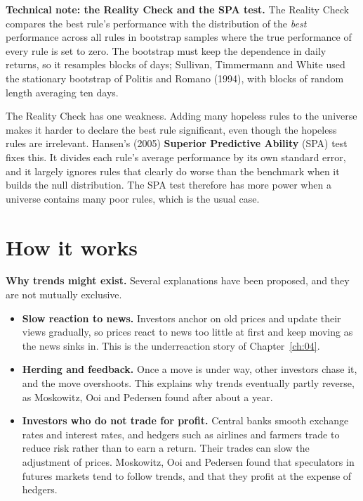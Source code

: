 \begin{technote}
\textbf{Technical note: the Reality Check and the SPA test.} The Reality Check compares the best rule's performance with the distribution of the \emph{best} performance across all rules in bootstrap samples where the true performance of every rule is set to zero. The bootstrap must keep the dependence in daily returns, so it resamples blocks of days; Sullivan, Timmermann and White used the stationary bootstrap of Politis and Romano (1994), with blocks of random length averaging ten days.

The Reality Check has one weakness. Adding many hopeless rules to the universe makes it harder to declare the best rule significant, even though the hopeless rules are irrelevant. Hansen's (2005) \textbf{Superior Predictive Ability} (SPA) test fixes this. It divides each rule's average performance by its own standard error, and it largely ignores rules that clearly do worse than the benchmark when it builds the null distribution. The SPA test therefore has more power when a universe contains many poor rules, which is the usual case.
\end{technote}


\section{How it works}
\label{sec:08-how}

\textbf{Why trends might exist.} Several explanations have been proposed, and they are not mutually exclusive.

\begin{itemize}
  \item \textbf{Slow reaction to news.} Investors anchor on old prices and update their views gradually, so prices react to news too little at first and keep moving as the news sinks in. This is the underreaction story of Chapter~\ref{ch:04}.
  \item \textbf{Herding and feedback.} Once a move is under way, other investors chase it, and the move overshoots. This explains why trends eventually partly reverse, as Moskowitz, Ooi and Pedersen found after about a year.
  \item \textbf{Investors who do not trade for profit.} Central banks smooth exchange rates and interest rates, and hedgers such as airlines and farmers trade to reduce risk rather than to earn a return. Their trades can slow the adjustment of prices. Moskowitz, Ooi and Pedersen found that speculators in futures markets tend to follow trends, and that they profit at the expense of hedgers.
\end{itemize}

